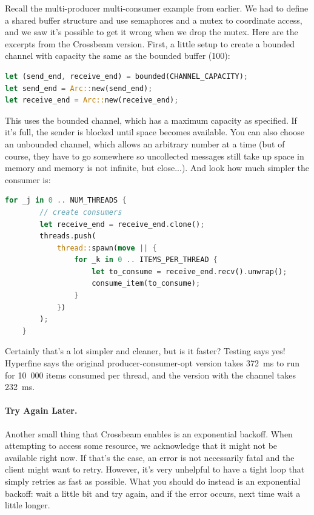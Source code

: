 Recall the multi-producer multi-consumer example from earlier. We had to define a shared buffer structure and use semaphores and a mutex to coordinate access, and we saw it's possible to get it wrong when we drop the mutex. Here are the excerpts from the Crossbeam version. First, a little setup to create a bounded channel with capacity the same as the bounded buffer (100): 

\begin{lstlisting}[language=Rust]
let (send_end, receive_end) = bounded(CHANNEL_CAPACITY);
let send_end = Arc::new(send_end);
let receive_end = Arc::new(receive_end);
\end{lstlisting}

This uses the bounded channel, which has a maximum capacity as specified. If it's full, the sender is blocked until space becomes available. You can also choose an unbounded channel, which allows an arbitrary number at a time (but of course, they have to go somewhere so uncollected messages still take up space in memory and memory is not infinite, but close...).
And look how much simpler the consumer is:
\begin{lstlisting}[language=Rust]
    for _j in 0 .. NUM_THREADS {
        // create consumers
        let receive_end = receive_end.clone();
        threads.push(
            thread::spawn(move || {
                for _k in 0 .. ITEMS_PER_THREAD {
                    let to_consume = receive_end.recv().unwrap();
                    consume_item(to_consume);
                }
            })
        );
    }
\end{lstlisting}

Certainly that's a lot simpler and cleaner, but is it faster? Testing says yes! Hyperfine says the original producer-consumer-opt version takes 372~ms to run for 10~000 items consumed per thread, and the version with the channel takes 232~ms. 

\paragraph{Try Again Later.}
Another small thing that Crossbeam enables is an exponential backoff. When attempting to access some resource, we acknowledge that it might not be available right now. If that's the case, an error is not necessarily fatal and the client might want to retry. However, it's very unhelpful to have a tight loop that simply retries as fast as possible. What you should do instead is an exponential backoff: wait a little bit and try again, and if the error occurs, next time wait a little longer.

